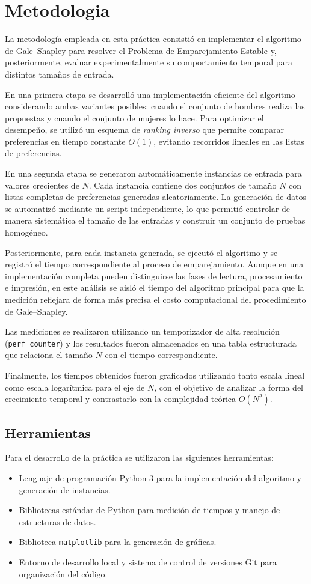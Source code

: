 \section{Metodologia}
La metodología empleada en esta práctica consistió en implementar el algoritmo de Gale--Shapley para resolver el Problema de Emparejamiento Estable y, posteriormente, evaluar experimentalmente su comportamiento temporal para distintos tamaños de entrada.

En una primera etapa se desarrolló una implementación eficiente del algoritmo considerando ambas variantes posibles: cuando el conjunto de hombres realiza las propuestas y cuando el conjunto de mujeres lo hace. Para optimizar el desempeño, se utilizó un esquema de \textit{ranking inverso} que permite comparar preferencias en tiempo constante $O(1)$, evitando recorridos lineales en las listas de preferencias.

En una segunda etapa se generaron automáticamente instancias de entrada para valores crecientes de $N$. Cada instancia contiene dos conjuntos de tamaño $N$ con listas completas de preferencias generadas aleatoriamente. La generación de datos se automatizó mediante un script independiente, lo que permitió controlar de manera sistemática el tamaño de las entradas y construir un conjunto de pruebas homogéneo.

Posteriormente, para cada instancia generada, se ejecutó el algoritmo y se registró el tiempo correspondiente al proceso de emparejamiento. Aunque en una implementación completa pueden distinguirse las fases de lectura, procesamiento e impresión, en este análisis se aisló el tiempo del algoritmo principal para que la medición reflejara de forma más precisa el costo computacional del procedimiento de Gale--Shapley.

Las mediciones se realizaron utilizando un temporizador de alta resolución (\texttt{perf\_counter}) y los resultados fueron almacenados en una tabla estructurada que relaciona el tamaño $N$ con el tiempo correspondiente.

Finalmente, los tiempos obtenidos fueron graficados utilizando tanto escala lineal como escala logarítmica para el eje de $N$, con el objetivo de analizar la forma del crecimiento temporal y contrastarlo con la complejidad teórica $O(N^2)$.

\subsection{Herramientas}

Para el desarrollo de la práctica se utilizaron las siguientes herramientas:

\begin{itemize}
    \item Lenguaje de programación Python 3 para la implementación del algoritmo y generación de instancias.
    \item Bibliotecas estándar de Python para medición de tiempos y manejo de estructuras de datos.
    \item Biblioteca \texttt{matplotlib} para la generación de gráficas.
    \item Entorno de desarrollo local y sistema de control de versiones Git para organización del código.
\end{itemize}
